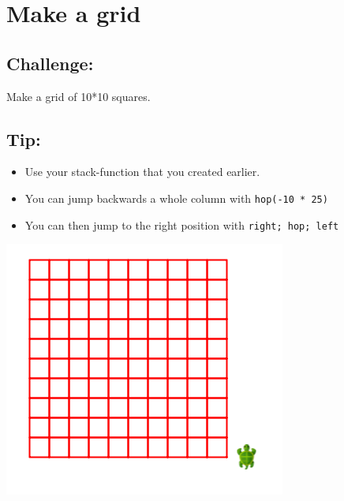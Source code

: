 \chapter{Make a grid}
\begin{multicols}{2}
\section*{\color{BrickRed}Challenge:}
Make a grid of 10*10 squares.
\section*{\color{OliveGreen}Tip:}


\begin{itemize}

\item {Use your stack-function that you created earlier.}
\item {You can jump backwards a whole column with \lstinline{hop(-10 * 25)}}
\item {You can then jump to the right position with \lstinline{right; hop; left}}

\end{itemize}



\columnbreak

\begin{center}
\includegraphics{../img/square-grid.png}
\end{center}

\end{multicols}

